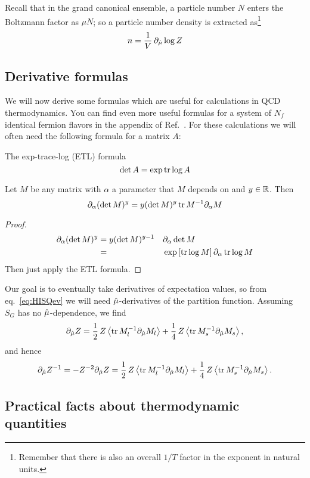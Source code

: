 Recall that in the grand canonical ensemble, a particle number
$N$ enters the Boltzmann factor as $\mu N$; so a particle number density 
is extracted as\footnote{Remember that there is also
an overall $1/T$ factor in the exponent in natural units.}
\begin{equation}
  n = \frac{1}{V}\,\partial_{\hat{\mu}}\log Z
\end{equation}

\subsection{Derivative formulas}

We will now derive some formulas which are useful for calculations in QCD
thermodynamics. You can find even more useful formulas for a system of 
$N_f$ identical
fermion flavors in the appendix of Ref.~\cite{allton_thermodynamics_2005}.
For these calculations we will often need the following formula for a
matrix $A$:
\begin{theorem}{The exp-trace-log (ETL) formula}{}\label{thm:exptrlog} 
  $$\det A = \exp \tr \log A$$
\end{theorem}
\begin{corollary}{}{} Let $M$ be any matrix with $\alpha$ a parameter that 
$M$ depends on and $y\in\mathbb{R}$. Then
$$
  \partial_\alpha(\det M)^y = y(\det M)^y \tr M^{-1}\partial_\alpha M
$$
\begin{proof}
\begin{equation*}\begin{aligned}
  \partial_\alpha(\det M)^y &= y(\det M)^{y-1}&&\partial_\alpha\det M\\
      &=  &&\exp\left[\tr\log M\right]\partial_\alpha\tr\log M
\end{aligned}\end{equation*}
Then just apply the ETL formula. 
\end{proof}
\end{corollary}

Our goal is to eventually take derivatives of expectation values, so from
eq.~\eqref{eq:HISQev} we will need $\hat{\mu}$-derivatives of the partition 
function. Assuming $S_G$ has no $\hat{\mu}$-dependence, we find
\begin{equation}
  \partial_{\muh}Z =   \frac{1}{2}\,Z\ev{\tr M_l^{-1}\partial_{\muh}M_l}
                     + \frac{1}{4}\,Z\ev{\tr M_s^{-1}\partial_{\muh}M_s},
\end{equation}
and hence 
\begin{equation}
  \partial_{\muh}Z^{-1} = -Z^{-2}\partial_{\muh}Z
                        =   \frac{1}{2}\,Z\ev{\tr M_l^{-1}\partial_{\muh}M_l}
                          + \frac{1}{4}\,Z\ev{\tr M_s^{-1}\partial_{\muh}M_s}.
\end{equation}

\subsection{Practical facts about thermodynamic quantities}



